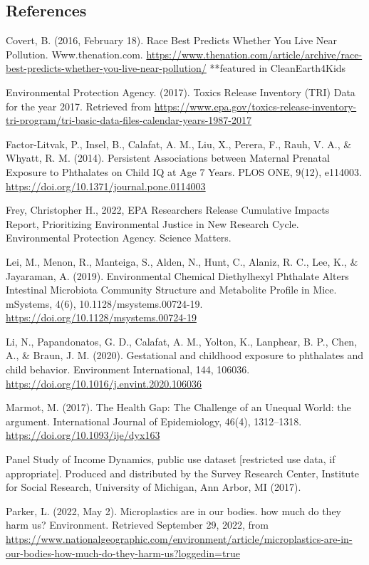 \documentclass[
]{article}
\begin{document}
\hypertarget{references}{%
\subsection{References}\label{references}}

Covert, B. (2016, February 18). Race Best Predicts Whether You Live Near
Pollution. Www.thenation.com.
\url{https://www.thenation.com/article/archive/race-best-predicts-whether-you-live-near-pollution/}
**featured in CleanEarth4Kids

Environmental Protection Agency. (2017). Toxics Release Inventory (TRI)
Data for the year 2017. Retrieved from
\url{https://www.epa.gov/toxics-release-inventory-tri-program/tri-basic-data-files-calendar-years-1987-2017}

Factor-Litvak, P., Insel, B., Calafat, A. M., Liu, X., Perera, F., Rauh,
V. A., \& Whyatt, R. M. (2014). Persistent Associations between Maternal
Prenatal Exposure to Phthalates on Child IQ at Age 7 Years. PLOS ONE,
9(12), e114003. \url{https://doi.org/10.1371/journal.pone.0114003}

Frey, Christopher H., 2022, EPA Researchers Release Cumulative Impacts
Report, Prioritizing Environmental Justice in New Research Cycle.
Environmental Protection Agency. Science Matters.

Lei, M., Menon, R., Manteiga, S., Alden, N., Hunt, C., Alaniz, R. C.,
Lee, K., \& Jayaraman, A. (2019). Environmental Chemical Diethylhexyl
Phthalate Alters Intestinal Microbiota Community Structure and
Metabolite Profile in Mice. mSystems, 4(6), 10.1128/msystems.00724-19.
\url{https://doi.org/10.1128/msystems.00724-19}

Li, N., Papandonatos, G. D., Calafat, A. M., Yolton, K., Lanphear, B.
P., Chen, A., \& Braun, J. M. (2020). Gestational and childhood exposure
to phthalates and child behavior. Environment International, 144,
106036. \url{https://doi.org/10.1016/j.envint.2020.106036}

Marmot, M. (2017). The Health Gap: The Challenge of an Unequal World:
the argument. International Journal of Epidemiology, 46(4), 1312--1318.
\url{https://doi.org/10.1093/ije/dyx163}

Panel Study of Income Dynamics, public use dataset {[}restricted use
data, if appropriate{]}. Produced and distributed by the Survey Research
Center, Institute for Social Research, University of Michigan, Ann
Arbor, MI (2017).

Parker, L. (2022, May 2). Microplastics are in our bodies. how much do
they harm us? Environment. Retrieved September 29, 2022, from
\url{https://www.nationalgeographic.com/environment/article/microplastics-are-in-our-bodies-how-much-do-they-harm-us?loggedin=true}
\end{document}
